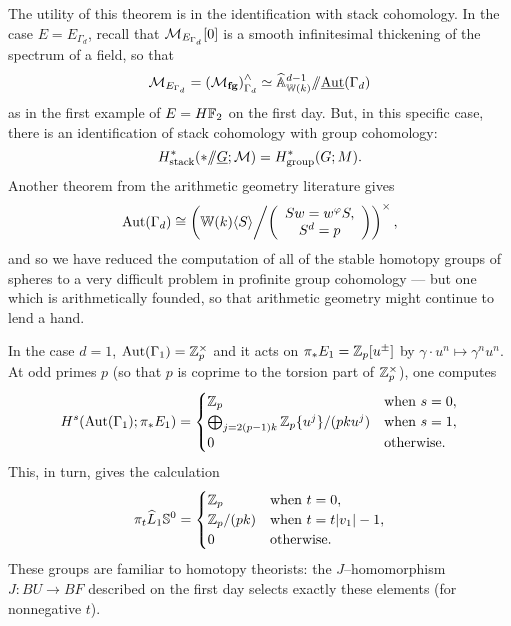 The utility of this theorem is in the identification with stack cohomology.  In the case $E = E_{\Gamma_d}$, recall that $\M_{E_{\Gamma_d}}[0]$ is a smooth infinitesimal thickening of the spectrum of a field, so that \[\M_{E_{\Gamma_d}} = \left( \moduli{fg} \right)^\wedge_{\Gamma_d} \simeq \widehat{\mathbb A}^{d-1}_{\mathbb W(k)} \mmod \underline{\operatorname{Aut}}(\Gamma_d)\] as in the first example of $E = H\F_2$ on the first day.  But, in this specific case, there is an identification of stack cohomology with group cohomology: \[H^*_{\mathrm{stack}}(* \mmod \underline{G}; \mathcal M) = H^*_{\mathrm{group}}(G; M).\]  Another theorem from the arithmetic geometry literature gives \[\operatorname{Aut}(\Gamma_d) \cong \left( \mathbb{W}(k)\langle S \rangle \middle/ \left( \begin{array}{c} Sw = w^\phi S, \\ S^d = p \end{array} \right) \right)^\times,\] and so we have reduced the computation of all of the stable homotopy groups of spheres to a very difficult problem in profinite group cohomology --- but one which is arithmetically founded, so that arithmetic geometry might continue to lend a hand.

\begin{example}[Adams]
In the case $d = 1$, $\operatorname{Aut}(\Gamma_1) = \Z_p^\times$ and it acts on $\pi_* E_1 = \Z_p[u^\pm]$ by $\gamma \cdot u^n \mapsto \gamma^n u^n$.  At odd primes $p$ (so that $p$ is coprime to the torsion part of $\Z_p^\times$), one computes \[H^s(\operatorname{Aut}(\Gamma_1); \pi_* E_1) = \begin{cases}\Z_p & \text{when $s = 0$}, \\ \bigoplus_{j = 2(p-1)k} \Z_p\{u^j\} / (pk u^j) & \text{when $s = 1$}, \\ 0 & \text{otherwise}. \end{cases}\]  This, in turn, gives the calculation \[\pi_t \widehat L_1 \S^0 = \begin{cases} \Z_p & \text{when $t = 0$}, \\ \Z_p / (pk) & \text{when $t = t|v_1| - 1$}, \\ 0 & \text{otherwise}. \end{cases}\]  These groups are familiar to homotopy theorists: the $J$--homomorphism $J: BU \to BF$ described on the first day selects exactly these elements (for nonnegative $t$).
\end{example}
